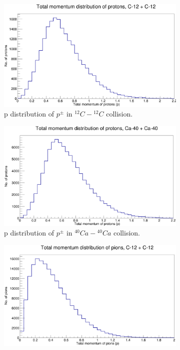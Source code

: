 \documentclass[12pt]{article}
\begin{document}
\begin{figure}[h]
\centering
\begin{subfigure}[h]{0.49\textwidth}
\centering
\includegraphics[scale=0.14]{pToT_protons_C12.png}
\caption{p distribution of $p^{\pm}$ in $^{12}C-{^{12}C}$ collision.}
\label{Generator - Total momentum distribution of protons C12.}
\end{subfigure}
\hfill
\vspace{1cm}
\begin{subfigure}[h]{0.49\textwidth}
\centering
\includegraphics[scale=0.14]{pToT_protons_Ca.png}
\caption{p distribution of $p^{\pm}$ in $^{40}Ca-{^{40}Ca}$ collision.}
\label{Generator - Total momentum distribution of protons Ca40.}
\end{subfigure}
\hfill
\begin{subfigure}[h]{0.49\textwidth}
\centering
\includegraphics[scale=0.14]{pToT_Pions_C12.png}

\end{subfigure}
\end{figure}
\end{document}
